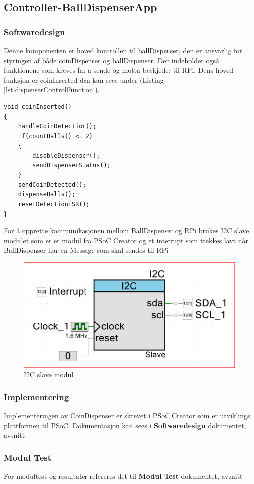 \documentclass[Rapport/Rapport_main.tex]{subfiles}
\begin{document}
\subsection{Controller-BallDispenserApp}
\subsubsection{Softwaredesign}
Denne komponenten er hoved kontrollen til ballDispenser, den er ansvarlig for styringen af både coinDispenser og ballDispenser. Den indeholder også funktionene som kreves får å sende og motta beskjeder til RPi. Dens hoved funksjon er coinInserted den kan sees under (Listing \ref{lst:dispenserControlFunction}). 
\begin{lstlisting}[caption={Hoved kontrol funksjonen til ballDispenser},style=customc,label={lst:dispenserControlFunction}]
void coinInserted()
{
    handleCoinDetection();
    if(countBalls() <= 2)
    {
        disableDispenser(); 
        sendDispenserStatus();
    }
    sendCoinDetected();
    dispenseBalls();
    resetDetectionISR();
}
\end{lstlisting}

For å opprette kommunikasjonen mellom BallDispenser og RPi brukes I2C slave modulet som er et modul fra PSoC Creator og et interrupt som trekkes lavt når BallDispenser har en Message som skal sendes til RPi.
\begin{figure}[H]
    \centering
    \includegraphics[width=\textwidth]{Rapport/BallDispenser/ballDispenserController/graphics/I2Cslave.png}
    \caption{I2C slave modul}
    \label{fig:I2CSlaveBallDisp}
\end{figure}

\subsubsection{Implementering}
Implementeringen av CoinDispenser er skrevet i  PSoC Creator som er utviklings plattformen til PSoC. Dokumentasjon kan sees i \textbf{Softwaredesign} dokumentet, avsnitt 
\subsubsection{Modul Test}
For modultest og resultater refereres det til \textbf{Modul Test} dokumentet, avsnitt 
\end{document}
